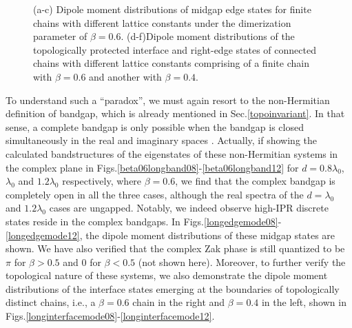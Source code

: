 \documentclass[aps,pra,reprint,groupedaddress,nofootinbib,longbibliography,showpacs]{revtex4-1}
\begin{document}
\begin{figure}[htbp]
	\centering
	\hspace{0.01in}
	\centering
{}
	\caption{(a-c) Dipole moment distributions of midgap edge states for finite chains with different lattice constants under the dimerization parameter of $\beta=0.6$. (d-f)Dipole moment distributions of the topologically protected interface and right-edge states of connected chains with different lattice constants comprising of a finite chain with $\beta=0.6$ and another with $\beta=0.4$.}\label{longedgmodes}
\end{figure}

To understand such a ``paradox'', we must again resort to the non-Hermitian definition of bandgap, which is already mentioned in Sec.\ref{topoinvariant}. In that sense, a complete bandgap is only possible when the bandgap is closed simultaneously in the real and imaginary spaces \cite{shenPRL2018}. Actually, if showing the calculated bandstructures of the eigenstates of these non-Hermitian systems in the complex plane in Figs.\ref{beta06longband08}-\ref{beta06longband12} for $d=0.8\lambda_0$, $\lambda_0$ and $1.2\lambda_0$ respectively, where $\beta=0.6$, we find that the complex bandgap is completely open in all the three cases, although the real spectra of the $d=\lambda_0$ and $1.2\lambda_0$ cases are ungapped. Notably, we indeed observe high-IPR discrete states reside in the complex bandgaps. In Figs.\ref{longedgemode08}-\ref{longedgemode12}, the dipole moment distributions of these midgap states are shown. We have also verified that the complex Zak phase is still quantized to be $\pi$ for $\beta>0.5$ and $0$ for $\beta<0.5$ (not shown here). Moreover, to further verify the topological nature of these systems, we also demonstrate the dipole moment distributions of the interface states emerging at the boundaries of topologically distinct chains, i.e., a $\beta=0.6$ chain in the right and $\beta=0.4$ in the left, shown in Figs.\ref{longinterfacemode08}-\ref{longinterfacemode12}.
\end{document}
